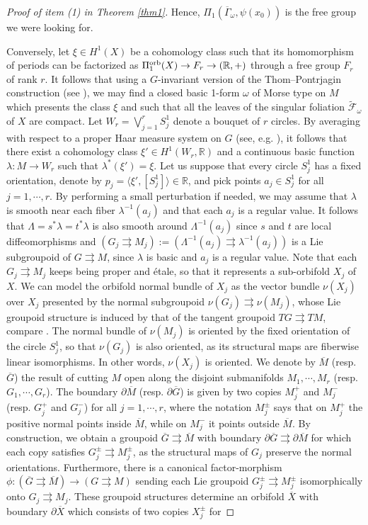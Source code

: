 \documentclass[
  a4paper, 
  reqno, 
  oneside, 
  12pt
]{amsart}
\theoremstyle{definition}
\theoremstyle{remark}
\newcommand{\rr}{\rightrightarrows}
\begin{document}
\begin{proof}[Proof of item (1) in Theorem \ref{thm1}]
\noindent Hence, $\Pi_1(\overline{\Gamma}_\omega, \psi(x_0))$ is the free group we were looking for.

Conversely, let $\xi\in H^1(X)$ be a cohomology class such that its homomorphism of periods can be factorized as $\Pi_1^{\textnormal{orb}}(X)\to F_r\to (\mathbb{R},+)$ through a free group $F_r$ of rank $r$. It follows that using a $G$-invariant version of the Thom--Pontrjagin construction (see \cite{FKL}), we may find a closed basic 1-form $\omega$ of Morse type on $M$ which presents the class $\xi$ and such that all the leaves of the singular foliation $\tilde{\mathcal{F}}_\omega$ of $X$ are compact. Let $W_r=\bigvee_{j=1}^r S^1_j$ denote a bouquet of $r$ circles. By averaging with respect to a proper Haar measure system on $G$ (see, e.g. \cite{CM}), it follows that there exist a cohomology class $\xi'\in H^1(W_r,\mathbb{R})$ and a continuous basic function $\lambda:M\to W_r$ such that $\lambda^\ast(\xi')=\xi$. Let us suppose that every circle $S_j^1$ has a fixed orientation, denote by $p_j=\langle \xi', [S^1_j]\rangle \in \mathbb{R}$, and pick points $a_j\in S^1_j$ for all $j=1,\cdots, r$. By performing a small perturbation if needed, we may assume that $\lambda$ is smooth near each fiber $\lambda^{-1}(a_j)$ and that each $a_j$ is a regular value. It follows that $\Lambda=s^\ast \lambda=t^\ast \lambda$ is also smooth around $\Lambda^{-1}(a_j)$ since $s$ and $t$ are local diffeomorphisms and $(G_j\rr M_j):=(\Lambda^{-1}(a_j)\rr \lambda^{-1}(a_j))$ is a Lie subgroupoid of $G\rr M$, since $\lambda$ is basic and $a_j$ is a regular value. Note that each $G_j\rr M_j$ keeps being proper and étale, so that it represents a sub-orbifold $X_j$ of $X$. We can model the orbifold normal bundle of $X_j$ as the vector bundle $\nu(X_j)$ over $X_j$ presented by the normal subgroupoid $\nu(G_j)\rr \nu(M_j)$, whose Lie groupoid structure is induced by that of the tangent groupoid $TG\rr TM$, compare \cite{dho}. The normal bundle of $\nu(M_j)$ is oriented by the fixed orientation of the circle $S^1_j$, so that $\nu(G_j)$ is also oriented, as its structural maps are fiberwise linear isomorphisms. In other words, $\nu(X_j)$ is oriented. We denote by $\overline{M}$ (resp. $\overline{G}$) the result of cutting $M$ open along the disjoint submanifolds $M_1, \cdots, M_r$ (resp. $G_1, \cdots, G_r$). The boundary $\partial \overline{M}$ (resp. $\partial \overline{G}$) is given by two copies $M_j^+$ and $M_j^-$ (resp. $G_j^+$ and $G_j^-$) for all $j=1, \cdots, r$, where the notation $M^{\pm}_j$ says that on $M^+_j$ the positive normal points inside $\overline{M}$, while on $M^-_j$ it points outside $\overline{M}$. By construction, we obtain a groupoid $\overline{G}\rr \overline{M}$ with boundary $\partial \overline{G}\rr \partial\overline{M}$ for which each copy satisfies $G^{\pm}_j\rr M^{\pm}_j$, as the structural maps of $G_j$ preserve the normal orientations. Furthermore, there is a canonical factor-morphism $\phi:(\overline{G}\rr \overline{M})\to (G\rr M)$ sending each Lie groupoid $G^{\pm}_j\rr M^{\pm}_j$ isomorphically onto $G_j\rr M_j$. These groupoid structures determine an orbifold $\overline{X}$ with boundary $\partial \overline{X}$ which consists of two copies $X^\pm_j$ for 
\end{proof}
\end{document}
